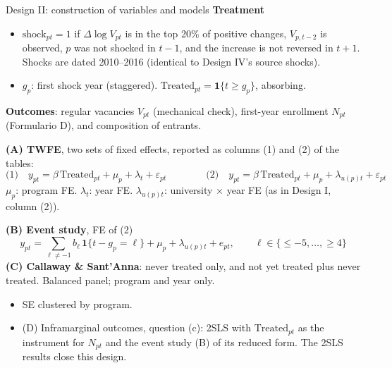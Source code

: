\documentclass{beamer}
\begin{document}
\begin{frame}{Design II: construction of variables and models}
\scriptsize
\setlength{\abovedisplayskip}{2pt}
\setlength{\belowdisplayskip}{2pt}
\textbf{Treatment}
\begin{itemize}
    \item $\text{shock}_{pt}=1$ if $\Delta\log V_{pt}$ is in the top 20\% of positive changes, $V_{p,t-2}$ is observed, $p$ was not shocked in $t-1$,
    and the increase is not reversed in $t+1$. Shocks are dated 2010--2016 (identical to Design IV's source shocks).
    \item $g_p$: first shock year (staggered). $\text{Treated}_{pt}=\mathbf 1\{t\ge g_p\}$, absorbing.
\end{itemize}

\textbf{Outcomes}: regular vacancies $V_{pt}$ (mechanical check), first-year enrollment $N_{pt}$ (Formulario D), and composition of entrants.

\vspace{0.08cm}
\textbf{(A) TWFE}, two sets of fixed effects, reported as columns (1) and (2) of the tables:
\[
\text{(1)}\quad y_{pt}=\beta\,\text{Treated}_{pt}+\mu_p+\lambda_t+\varepsilon_{pt}
\qquad\qquad
\text{(2)}\quad y_{pt}=\beta\,\text{Treated}_{pt}+\mu_p+\lambda_{u(p)t}+\varepsilon_{pt}
\]
{\tiny $\mu_p$: program FE. $\lambda_t$: year FE. $\lambda_{u(p)t}$: university $\times$ year FE (as in Design I, column (2)).}

\textbf{(B) Event study}, FE of (2)
\[
y_{pt}=\sum_{\ell\neq-1}b_\ell\,\mathbf 1\{t-g_p=\ell\}+\mu_p+\lambda_{u(p)t}+e_{pt},\qquad \ell\in\{\le-5,\dots,\ge4\}
\]
\textbf{(C) Callaway \& Sant'Anna}: never treated only, and not yet treated plus never treated. Balanced panel; program and year only.

\vspace{0.05cm}
\begin{itemize}
    \item SE clustered by program.
    \item (D) Inframarginal outcomes, question (c): 2SLS with $\text{Treated}_{pt}$ as the instrument for $N_{pt}$ and the event study (B) of its reduced form. The 2SLS results close this design.
\end{itemize}
\end{frame}
\end{document}
